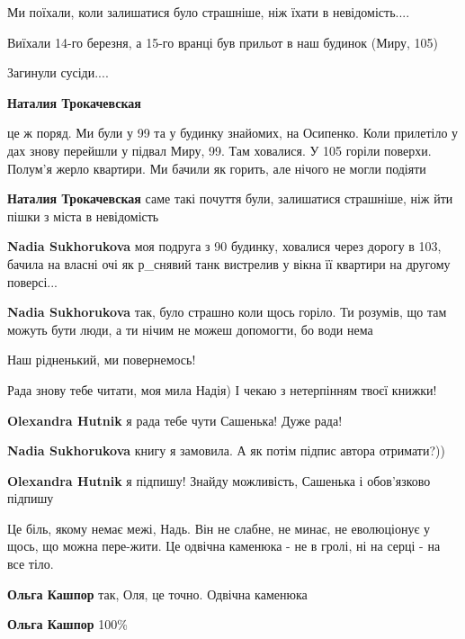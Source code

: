 Ми поїхали, коли залишатися було страшніше, ніж їхати в невідомість....

Виїхали 14-го березня, а 15-го вранці був прильот в наш будинок (Миру, 105)

Загинули сусіди....

\begin{itemize} %
\textbf{Наталия Трокачевская} 

це ж поряд. Ми були у 99 та у будинку знайомих, на Осипенко. Коли прилетіло у
дах знову перейшли у підвал Миру, 99. Там ховалися. У 105 горіли поверхи.
Полум'я жерло квартири. Ми бачили як горить, але нічого не могли подіяти

\textbf{Наталия Трокачевская} саме такі почуття були, залишатися страшніше, ніж йти пішки з міста в невідомість

\textbf{Nadia Sukhorukova} моя подруга з 90 будинку, ховалися через дорогу в 103, бачила на власні очі як р\_снявий танк вистрелив у вікна її квартири на другому поверсі...

\textbf{Nadia Sukhorukova} так, було страшно коли щось горіло. Ти розумів, що там можуть бути люди, а ти нічим не можеш допомогти,
бо води нема
\end{itemize} %



Наш рідненький, ми повернемось!


Рада знову тебе читати, моя мила Надія) І чекаю з нетерпінням твоєї книжки!

\begin{itemize} %
\textbf{Olexandra Hutnik} я рада тебе чути Сашенька! Дуже рада!

\textbf{Nadia Sukhorukova} книгу я замовила. А як потім підпис автора отримати?))

\textbf{Olexandra Hutnik} я підпишу! Знайду можливість, Сашенька і обов'язково підпишу
\end{itemize} %


Це біль, якому немає межі, Надь. Він не слабне, не минає, не еволюціонує у
щось, що можна пере-жити. Це одвічна каменюка - не в гролі, ні на серці - на
все тіло.

\begin{itemize} %
\textbf{Ольга Кашпор} так, Оля, це точно. Одвічна каменюка

\textbf{Ольга Кашпор} 100\%
\end{itemize} %

